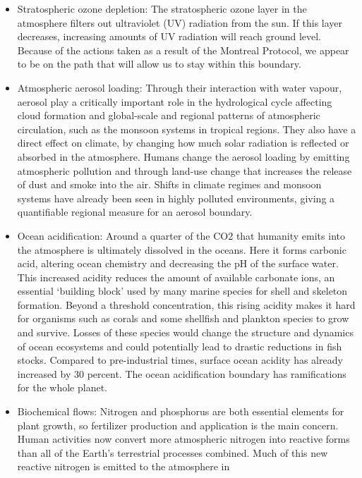 \documentclass[12pt,oneside]{book}
\begin{document}
\begin{itemize}
\item
  Stratospheric ozone depletion: The stratospheric ozone layer in the
  atmosphere filters out ultraviolet (UV) radiation from the sun. If
  this layer decreases, increasing amounts of UV radiation will reach
  ground level. Because of the actions taken as a result of the Montreal
  Protocol, we appear to be on the path that will allow us to stay
  within this boundary.
\item
  Atmospheric aerosol loading: Through their interaction with water
  vapour, aerosol play a critically important role in the hydrological
  cycle affecting cloud formation and global-scale and regional patterns
  of atmospheric circulation, such as the monsoon systems in tropical
  regions. They also have a direct effect on climate, by changing how
  much solar radiation is reflected or absorbed in the atmosphere.
  Humans change the aerosol loading by emitting atmospheric pollution
  and through land-use change that increases the release of dust and
  smoke into the air. Shifts in climate regimes and monsoon systems have
  already been seen in highly polluted environments, giving a
  quantifiable regional measure for an aerosol boundary.
\item
  Ocean acidification: Around a quarter of the CO2 that humanity emits
  into the atmosphere is ultimately dissolved in the oceans. Here it
  forms carbonic acid, altering ocean chemistry and decreasing the pH of
  the surface water. This increased acidity reduces the amount of
  available carbonate ions, an essential `building block' used by many
  marine species for shell and skeleton formation. Beyond a threshold
  concentration, this rising acidity makes it hard for organisms such as
  corals and some shellfish and plankton species to grow and survive.
  Losses of these species would change the structure and dynamics of
  ocean ecosystems and could potentially lead to drastic reductions in
  fish stocks. Compared to pre-industrial times, surface ocean acidity
  has already increased by 30 percent. The ocean acidification boundary
  has ramifications for the whole planet.
\item
  Biochemical flows: Nitrogen and phosphorus are both essential elements
  for plant growth, so fertilizer production and application is the main
  concern. Human activities now convert more atmospheric nitrogen into
  reactive forms than all of the Earth's terrestrial processes combined.
  Much of this new reactive nitrogen is emitted to the atmosphere in

\end{itemize}
\end{document}
